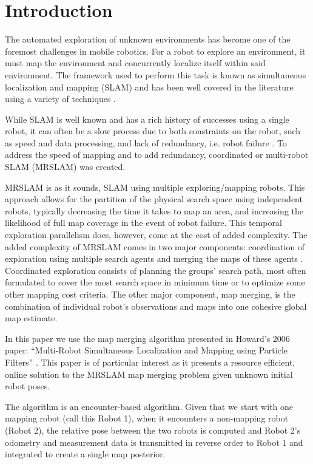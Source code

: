 \section{Introduction}
\label{S:Intro}


The automated exploration of unknown environments has become one of the foremost challenges in mobile robotics. For a robot to explore an environment, it must map the environment and concurrently localize itself within said environment.  The framework used to perform this task is known as simultaneous localization and mapping (SLAM) and has been well covered in the literature using a variety of techniques \cite{durrant2006simultaneous,bailey2006simultaneous}.

While SLAM is well known and has a rich history of successes using a single robot, it can often be a slow process due to both constraints on the robot, such as speed and data processing, and lack of redundancy, i.e. robot failure \cite{thrun2001probabilistic,burgard2005coordinated}.  To address the speed of mapping and to add redundancy, coordinated or multi-robot SLAM (MRSLAM) was created.

MRSLAM is as it sounds, SLAM using multiple exploring/mapping robots. This approach allows for the partition of the physical search space using independent robots, typically decreasing the time it takes to map an area, and increasing the likelihood of full map coverage in the event of robot failure. This temporal exploration parallelism does, however, come at the cost of added complexity. The added complexity of MRSLAM comes in two major components: coordination of exploration using multiple search agents and merging the maps of these agents \cite{fox2006distributed}.  Coordinated exploration consists of planning the groups' search path, most often formulated to cover the most search space in minimum time or to optimize some other mapping cost criteria. The other major component, map merging, is the combination of individual robot's observations and maps into one cohesive global map estimate.

In this paper we use the map merging algorithm presented in Howard's 2006 paper: ``Multi-Robot Simultaneous Localization and Mapping using Particle Filters'' \cite{howard2006multi}. This paper is of particular interest as it presents a resource efficient, online solution to the MRSLAM map merging problem given unknown initial robot poses.  

The algorithm is an encounter-based algorithm.  Given that we start with one mapping robot (call this Robot 1), when it encounters a non-mapping robot (Robot 2), the relative pose between the two robots is computed and Robot 2's odometry and measurement data is transmitted in reverse order to Robot 1 and integrated to create a single map posterior.  

